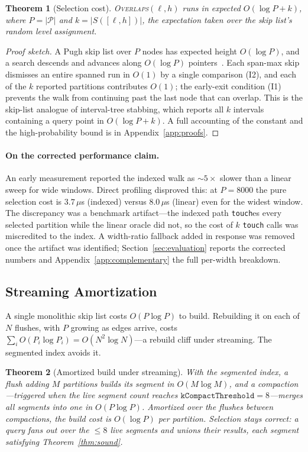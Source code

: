 \documentclass[10pt]{article}
\newtheorem{theorem}{Theorem}
\theoremstyle{definition}
\begin{document}
\begin{theorem}[Selection cost]
\label{thm:cost}
\textsc{Overlaps}$(\ell,h)$ runs in expected $O(\log P + k)$, where $P=|\mathcal{P}|$
and $k=|S([\ell,h])|$, the expectation taken over the skip list's random level
assignment.
\end{theorem}
\begin{proof}[Proof sketch]
A Pugh skip list over $P$ nodes has expected height $O(\log P)$, and a search
descends and advances along $O(\log P)$ pointers~\citep{pugh1990skiplists}. Each
span-max skip dismisses an entire spanned run in $O(1)$ by a single comparison
(I2), and each of the $k$ reported partitions contributes $O(1)$; the early-exit
condition (I1) prevents the walk from continuing past the last node that can
overlap. This is the skip-list analogue of interval-tree stabbing, which reports
all $k$ intervals containing a query point in $O(\log P + k)$. A full accounting of
the constant and the high-probability bound is in Appendix~\ref{app:proofs}.
\end{proof}

\paragraph{On the corrected performance claim.}
An early measurement reported the indexed walk as ${\sim}5\times$ slower than a
linear sweep for wide windows. Direct profiling disproved this: at $P=8000$ the
pure selection cost is $3.7\,\mu$s (indexed) versus $8.0\,\mu$s (linear) even for
the widest window. The discrepancy was a benchmark artifact---the indexed path
\texttt{touch}es every selected partition while the linear oracle did not, so the
cost of $k$ \texttt{touch} calls was miscredited to the index. A width-ratio
fallback added in response was removed once the artifact was identified;
Section~\ref{sec:evaluation} reports the corrected numbers and
Appendix~\ref{app:complementary} the full per-width breakdown.

\subsection{Streaming Amortization}
\label{sec:amort}

A single monolithic skip list costs $O(P\log P)$ to build. Rebuilding it on each of
$N$ flushes, with $P$ growing as edges arrive, costs
$\sum_i O(P_i\log P_i)=O(N^2\log N)$---a rebuild cliff under streaming. The
segmented index avoids it.

\begin{theorem}[Amortized build under streaming]
\label{thm:amort}
With the segmented index, a flush adding $M$ partitions builds its segment in
$O(M\log M)$, and a compaction---triggered when the live segment count reaches
$\texttt{kCompactThreshold}=8$---merges all segments into one in $O(P\log P)$.
Amortized over the flushes between compactions, the build cost is $O(\log P)$ per
partition. Selection stays correct: a query fans out over the $\le 8$ live segments
and unions their results, each segment satisfying Theorem~\ref{thm:sound}.
\end{theorem}
\end{document}
